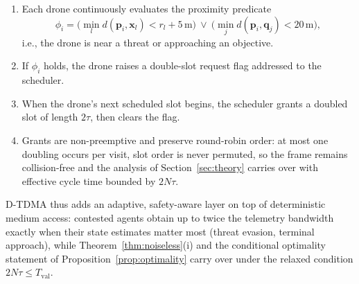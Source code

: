 \begin{enumerate}
    \item Each drone continuously evaluates the proximity predicate
    \begin{equation}
        \phi_i = \Big( \min_l d(\mathbf{p}_i, \mathbf{x}_l) < r_l + 5\,\mathrm{m} \Big)
        \ \lor\
        \Big( \min_j d(\mathbf{p}_i, \mathbf{q}_j) < 20\,\mathrm{m} \Big),
        \label{eq:dtdma-predicate}
    \end{equation}
    i.e., the drone is near a threat or approaching an objective.
    \item If $\phi_i$ holds, the drone raises a double-slot request flag addressed to the scheduler.
    \item When the drone's next scheduled slot begins, the scheduler grants a doubled slot of length $2\tau$, then clears the flag.
    \item Grants are non-preemptive and preserve round-robin order: at most one doubling occurs per visit, slot order is never permuted, so the frame remains collision-free and the analysis of Section~\ref{sec:theory} carries over with effective cycle time bounded by $2N\tau$.
\end{enumerate}

D-TDMA thus adds an adaptive, safety-aware layer on top of deterministic medium access: contested agents obtain up to twice the telemetry bandwidth exactly when their state estimates matter most (threat evasion, terminal approach), while Theorem~\ref{thm:noiseless}(i) and the conditional optimality statement of Proposition~\ref{prop:optimality} carry over under the relaxed condition $2N\tau \leq T_{\mathrm{val}}$.
